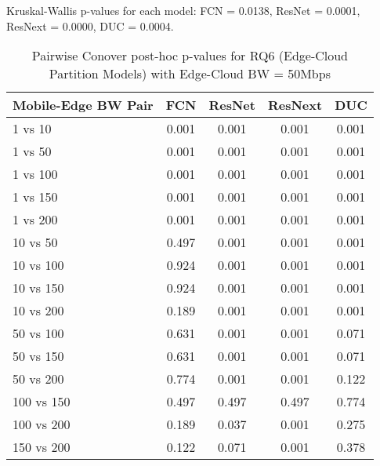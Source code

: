 \begin{table}[h]
\centering
\caption{Pairwise Conover post-hoc p-values for RQ6 (Edge-Cloud Partition Models) with Edge-Cloud BW = 50Mbps}
\label{tab:conover_edge_cloud_partition_ec50}
\smallskip
Kruskal-Wallis p-values for each model: FCN = 0.0138, ResNet = 0.0001, ResNext = 0.0000, DUC = 0.0004.

\begin{tabular}{lcccc}
\toprule
Mobile-Edge BW Pair & FCN & ResNet & ResNext & DUC \\
\midrule
1 vs 10 & 0.001 & 0.001 & 0.001 & 0.001 \\
1 vs 50 & 0.001 & 0.001 & 0.001 & 0.001 \\
1 vs 100 & 0.001 & 0.001 & 0.001 & 0.001 \\
1 vs 150 & 0.001 & 0.001 & 0.001 & 0.001 \\
1 vs 200 & 0.001 & 0.001 & 0.001 & 0.001 \\
10 vs 50 & 0.497 & 0.001 & 0.001 & 0.001 \\
10 vs 100 & 0.924 & 0.001 & 0.001 & 0.001 \\
10 vs 150 & 0.924 & 0.001 & 0.001 & 0.001 \\
10 vs 200 & 0.189 & 0.001 & 0.001 & 0.001 \\
50 vs 100 & 0.631 & 0.001 & 0.001 & 0.071 \\
50 vs 150 & 0.631 & 0.001 & 0.001 & 0.071 \\
50 vs 200 & 0.774 & 0.001 & 0.001 & 0.122 \\
100 vs 150 & 0.497 & 0.497 & 0.497 & 0.774 \\
100 vs 200 & 0.189 & 0.037 & 0.001 & 0.275 \\
150 vs 200 & 0.122 & 0.071 & 0.001 & 0.378 \\
\bottomrule
\end{tabular}
\end{table}

